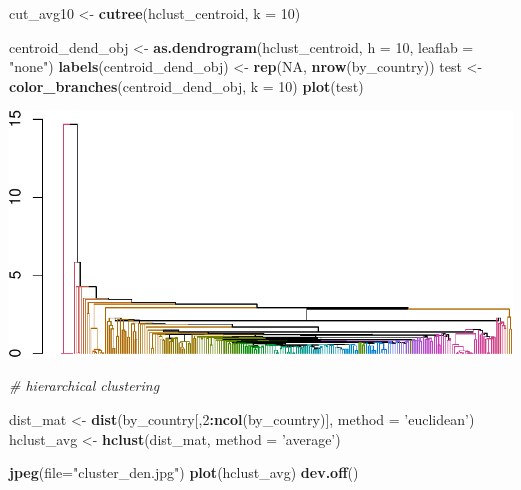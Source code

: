 \documentclass[]{article}
\newenvironment{Shaded}{\begin{snugshade}}{\end{snugshade}}
\newcommand{\CommentTok}[1]{\textcolor[rgb]{0.56,0.35,0.01}{\textit{#1}}}
\newcommand{\DataTypeTok}[1]{\textcolor[rgb]{0.13,0.29,0.53}{#1}}
\newcommand{\DecValTok}[1]{\textcolor[rgb]{0.00,0.00,0.81}{#1}}
\newcommand{\KeywordTok}[1]{\textcolor[rgb]{0.13,0.29,0.53}{\textbf{#1}}}
\newcommand{\NormalTok}[1]{#1}
\newcommand{\OperatorTok}[1]{\textcolor[rgb]{0.81,0.36,0.00}{\textbf{#1}}}
\newcommand{\OtherTok}[1]{\textcolor[rgb]{0.56,0.35,0.01}{#1}}
\newcommand{\StringTok}[1]{\textcolor[rgb]{0.31,0.60,0.02}{#1}}
\begin{document}
\begin{Shaded}
\begin{Highlighting}[]
\NormalTok{cut_avg10 <-}\StringTok{ }\KeywordTok{cutree}\NormalTok{(hclust_centroid, }\DataTypeTok{k =} \DecValTok{10}\NormalTok{)}

\NormalTok{centroid_dend_obj <-}\StringTok{ }\KeywordTok{as.dendrogram}\NormalTok{(hclust_centroid, }\DataTypeTok{h =} \DecValTok{10}\NormalTok{, }\DataTypeTok{leaflab =} \StringTok{"none"}\NormalTok{)}
\KeywordTok{labels}\NormalTok{(centroid_dend_obj) <-}\StringTok{ }\KeywordTok{rep}\NormalTok{(}\OtherTok{NA}\NormalTok{, }\KeywordTok{nrow}\NormalTok{(by_country))}
\NormalTok{test <-}\StringTok{ }\KeywordTok{color_branches}\NormalTok{(centroid_dend_obj, }\DataTypeTok{k =} \DecValTok{10}\NormalTok{)}
\KeywordTok{plot}\NormalTok{(test)}
\end{Highlighting}
\end{Shaded}

\includegraphics{eda_files/figure-latex/unnamed-chunk-17-2.pdf}

\begin{Shaded}
\begin{Highlighting}[]
\CommentTok{# hierarchical clustering}

\NormalTok{dist_mat <-}\StringTok{ }\KeywordTok{dist}\NormalTok{(by_country[,}\DecValTok{2}\OperatorTok{:}\KeywordTok{ncol}\NormalTok{(by_country)], }\DataTypeTok{method =} \StringTok{'euclidean'}\NormalTok{)}
\NormalTok{hclust_avg <-}\StringTok{ }\KeywordTok{hclust}\NormalTok{(dist_mat, }\DataTypeTok{method =} \StringTok{'average'}\NormalTok{)}

\KeywordTok{jpeg}\NormalTok{(}\DataTypeTok{file=}\StringTok{"cluster_den.jpg"}\NormalTok{)}
\KeywordTok{plot}\NormalTok{(hclust_avg)}
\KeywordTok{dev.off}\NormalTok{()}
\end{Highlighting}
\end{Shaded}
\end{document}

